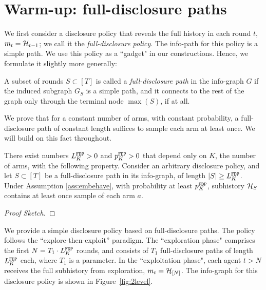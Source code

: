 \section{Warm-up: full-disclosure paths}
\label{sec:warmup}
We first consider a disclosure policy that reveals the full history in each round $t$, \ie $m_t=\mathcal{H}_{t-1}$; we call it the \emph{full-disclosure policy}. The info-path for this policy is a simple path. We use this policy as a ``gadget" in our constructions. Hence, we formulate it slightly more generally:
  
\begin{definition}
A subset of rounds $S\subset [T]$ is called a \emph{full-disclosure path} in the  info-graph $G$ if the induced subgraph $G_S$ is a simple path, and it connects to the rest of the graph only through the terminal node $\max(S)$, if at all.
\end{definition}
  
We prove that for a constant number of arms, with constant probability, a full-disclosure path of constant length suffices to sample each arm at least once. We will build on this fact throughout.

\begin{lemma}\label{lem:greedy}
There exist numbers $L^\mathtt{FDP}_K>0$ and $p^\mathtt{FDP}_K>0$ that depend only on $K$, the number of arms, with the following property. Consider an arbitrary disclosure policy, and let $S\subset [T]$ be a full-disclosure path in its info-graph, of length $|S|\geq L^\mathtt{FDP}_K$. Under Assumption \ref{ass:embehave}, with probability at least $p^\mathtt{FDP}_K$, subhistory $\mathcal{H}_{S}$ contains at least once sample of each arm $a$.
\end{lemma}

\begin{proof}[Proof Sketch]
\end{proof}


We provide a simple disclosure policy based on full-disclosure paths. The policy follows the ``explore-then-exploit'' paradigm. The ``exploration phase" comprises the first $N = T_1\cdot L^\mathtt{FDP}_K$ rounds, and consists of $T_1$ full-disclosure paths of length $L^\mathtt{FDP}_K$ each, where $T_1$ is a parameter. In the ``exploitation phase", each agent $t>N$ receives the full subhistory from exploration, \ie $m_t = \mathcal{H}_{[N]}$. The info-graph for this disclosure policy is shown in Figure~\ref{fig:2level}.

